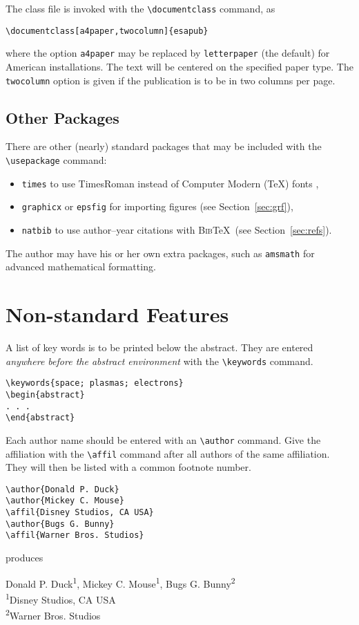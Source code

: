 \documentclass[a4paper,twocolumn]{esapub2005} %
\newcommand{\btx}{\textsc{Bib}\TeX}
\newcommand{\filename}{esapub}
\begin{document}
The class file is invoked with the \verb!\documentclass! command, as

\verb!\documentclass[a4paper,twocolumn]{!\texttt{\filename}\verb!}!

where the option \texttt{a4paper} may be replaced by \texttt{letterpaper}
(the default) for American installations. The text will be centered on the
specified paper type. The \texttt{twocolumn} option is given if the
publication is to be in two columns per page.

\subsection{Other Packages}

There are other (nearly) standard packages that may be included with
the \verb!\usepackage! command:
\begin{itemize}
\item \texttt{times} to use TimesRoman instead of Computer Modern (\TeX)
   fonts ,
\item \texttt{graphicx} or \texttt{epsfig} for importing figures (see
   Section~\ref{sec:grf}),
\item \texttt{natbib} to use author--year citations with \btx\ (see
    Section~\ref{sec:refs}).
\end{itemize}

The author may have his or her own extra packages, such as
\texttt{amsmath} for advanced mathematical formatting.

\section{Non-standard Features}

A list of key words is to be printed below the abstract. They are entered
\emph{anywhere before the abstract environment} with the \verb!\keywords!
command.
\begin{verbatim}
\keywords{space; plasmas; electrons}
\begin{abstract}
. . .
\end{abstract}
\end{verbatim}

Each author name should be entered with an \verb!\author! command. Give
the affiliation with the \verb!\affil! command after all authors of the
same affiliation. They will then be listed with a common footnote number.
\begin{verbatim}
\author{Donald P. Duck}
\author{Mickey C. Mouse}
\affil{Disney Studios, CA USA}
\author{Bugs G. Bunny}
\affil{Warner Bros. Studios}
\end{verbatim}
produces
\begin{center}
Donald P. Duck\textsuperscript{1}, Mickey C. Mouse\textsuperscript{1},
Bugs G. Bunny\textsuperscript{2}\\[0.5ex]
\textsuperscript{1}Disney Studios, CA USA\\
\textsuperscript{2}Warner Bros. Studios
\end{center}
\end{document}
